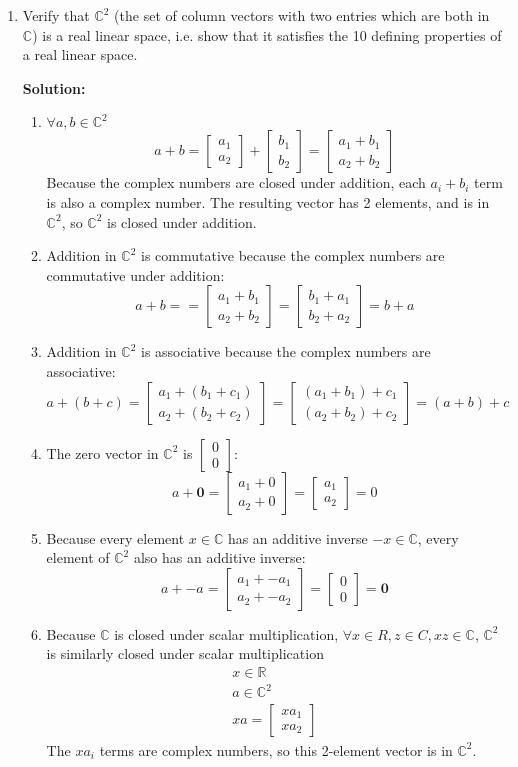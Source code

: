 \documentclass[]{article}
\newcommand{\R}{\mathbb{R}}
\newcommand{\C}{\mathbb{C}}
\newcommand{\bbm}{\begin{bmatrix}}
\newcommand{\ebm}{\end{bmatrix}}
\newcommand{\solution}{\vskip 0.5cm \textbf{\large Solution:} \\}
\begin{document}
\begin{enumerate}[resume]
	\item Verify that $\mathbb{C}^2$ (the set of column vectors with two entries which are both in $\mathbb{C}$) is a real linear space, i.e. show that it satisfies the 10 defining properties of a real linear space.

	  \solution
      \begin{enumerate}
      \item $\forall a,b \in \C^2$
        \[
        a + b = \bbm a_1 \\ a_2 \ebm + \bbm b_1 \\ b_2 \ebm = \bbm a_1 + b_1 \\ a_2 + b_2 \ebm
        \]
        Because the complex numbers are closed under addition, each
        $a_i + b_i$ term is also a complex number. The resulting
        vector has 2 elements, and is in $\C^2$, so $\C^2$ is closed
        under addition.
      \item Addition in $\C^2$ is commutative because the complex
          numbers are commutative under addition:
          \[
        a + b = = \bbm a_1 + b_1 \\ a_2 + b_2 \ebm = \bbm b_1 + a_1 \\ b_2 + a_2 \ebm = b + a
        \]
      \item Addition in $\C^2$ is associative because the complex
        numbers are associative:
        \[
        a + (b + c) = \bbm a_1 + (b_1 + c_1) \\ a_2 + (b_2 + c_2) \ebm = \bbm (a_1 + b_1) + c_1 \\ (a_2 + b_2) + c_2 \ebm = (a + b) + c
        \]
      \item The zero vector in $\C^2$ is $\bbm 0 \\ 0 \ebm$:
        \[
        a + \bm{0} = \bbm a_1 + 0 \\ a_2 + 0 \ebm  = \bbm a_1 \\ a_2 \ebm = 0
        \]
      \item Because every element $x \in \C$ has an additive inverse
        $-x \in \C$, every element of $\C^2$ also has an additive
        inverse:
        \[
        a + -a = \bbm a_1 + -a_1 \\ a_2 + -a_2 \ebm = \bbm 0 \\ 0 \ebm = \bm{0}
        \]
      \item Because $\C$ is closed under scalar multiplication,
        $\forall x \in R, z \in C, xz \in \C$, $\C^2$ is similarly
        closed under scalar multiplication
        \begin{gather}
          x \in \R \\
          a \in \C^2 \\
          x a = \bbm x a_1 \\ x a_2 \ebm
        \end{gather}
        The $x a_i$ terms are complex numbers, so this 2-element vector is in $\C^2$.
        

\end{enumerate}
\end{enumerate}
\end{document}
